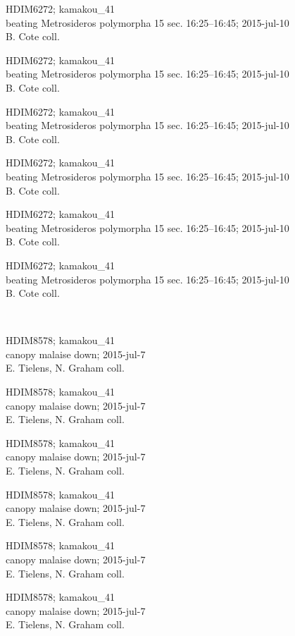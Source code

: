 \documentclass[2pt]{extarticle}
\begin{document}
\noindent
\parbox{0.16\textwidth}{\tiny \raggedright \rule[-0.3\baselineskip]{0pt}{10pt}HDIM6272; kamakou\_41\\ beating Metrosideros polymorpha 15 sec. 16:25--16:45; 2015-jul-10\\ B. Cote coll.}
\parbox{0.16\textwidth}{\tiny \raggedright \rule[-0.3\baselineskip]{0pt}{10pt}HDIM6272; kamakou\_41\\ beating Metrosideros polymorpha 15 sec. 16:25--16:45; 2015-jul-10\\ B. Cote coll.}
\parbox{0.16\textwidth}{\tiny \raggedright \rule[-0.3\baselineskip]{0pt}{10pt}HDIM6272; kamakou\_41\\ beating Metrosideros polymorpha 15 sec. 16:25--16:45; 2015-jul-10\\ B. Cote coll.}
\parbox{0.16\textwidth}{\tiny \raggedright \rule[-0.3\baselineskip]{0pt}{10pt}HDIM6272; kamakou\_41\\ beating Metrosideros polymorpha 15 sec. 16:25--16:45; 2015-jul-10\\ B. Cote coll.}
\parbox{0.16\textwidth}{\tiny \raggedright \rule[-0.3\baselineskip]{0pt}{10pt}HDIM6272; kamakou\_41\\ beating Metrosideros polymorpha 15 sec. 16:25--16:45; 2015-jul-10\\ B. Cote coll.}
\parbox{0.16\textwidth}{\tiny \raggedright \rule[-0.3\baselineskip]{0pt}{10pt}HDIM6272; kamakou\_41\\ beating Metrosideros polymorpha 15 sec. 16:25--16:45; 2015-jul-10\\ B. Cote coll.} \\ 
\vspace{0.001in} 

\noindent
\parbox{0.16\textwidth}{\tiny \raggedright \rule[-0.3\baselineskip]{0pt}{10pt}HDIM8578; kamakou\_41\\ canopy malaise down; 2015-jul-7\\ E. Tielens, N. Graham coll.}
\parbox{0.16\textwidth}{\tiny \raggedright \rule[-0.3\baselineskip]{0pt}{10pt}HDIM8578; kamakou\_41\\ canopy malaise down; 2015-jul-7\\ E. Tielens, N. Graham coll.}
\parbox{0.16\textwidth}{\tiny \raggedright \rule[-0.3\baselineskip]{0pt}{10pt}HDIM8578; kamakou\_41\\ canopy malaise down; 2015-jul-7\\ E. Tielens, N. Graham coll.}
\parbox{0.16\textwidth}{\tiny \raggedright \rule[-0.3\baselineskip]{0pt}{10pt}HDIM8578; kamakou\_41\\ canopy malaise down; 2015-jul-7\\ E. Tielens, N. Graham coll.}
\parbox{0.16\textwidth}{\tiny \raggedright \rule[-0.3\baselineskip]{0pt}{10pt}HDIM8578; kamakou\_41\\ canopy malaise down; 2015-jul-7\\ E. Tielens, N. Graham coll.}
\parbox{0.16\textwidth}{\tiny \raggedright \rule[-0.3\baselineskip]{0pt}{10pt}HDIM8578; kamakou\_41\\ canopy malaise down; 2015-jul-7\\ E. Tielens, N. Graham coll.} \\ 
\vspace{0.001in} 
\end{document}
